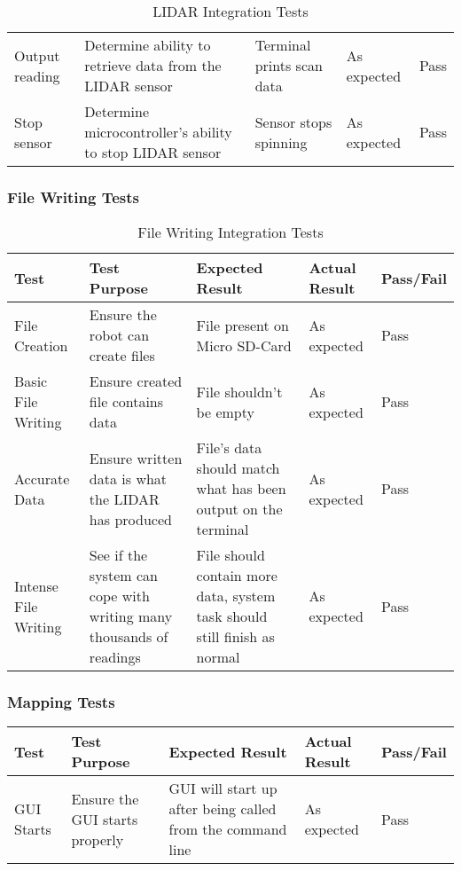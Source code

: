 \begin{landscape}
\begin{table}[h!]
\begin{tabular}{| p{2.5cm} | p{5cm} | p{4cm} | p{3cm} | p{1.5cm} |}
							Output reading & Determine ability to retrieve data from the LIDAR sensor & Terminal prints scan data & As expected & Pass \\
							 
							Stop sensor & Determine microcontroller's ability to stop LIDAR sensor & Sensor stops spinning & As expected & Pass   \\ [1ex] 
							\hline
						\end{tabular}	
					\caption{LIDAR Integration Tests}	
					\label{table:lidartestbasic}
					\end{table}
				
					\subsubsection{File Writing Tests}
					\begin{table}[h!]
						\centering
						\begin{tabular}{| p{2.5cm} | p{5cm} | p{4cm} | p{3cm} | p{1.5cm} |} 
							\hline
							Test & Test Purpose & Expected Result & Actual Result & Pass/Fail \\ [0.5ex] 
							\hline
							File Creation & Ensure the robot can create files & File present on Micro SD-Card & As expected & Pass  \\
							
							Basic File Writing & Ensure created file contains data & File shouldn't be empty & As expected & Pass \\
							
							Accurate Data & Ensure written data is what the LIDAR has produced & File's data should match what has been output on the terminal & As expected & Pass \\ 
							
							Intense File Writing & See if the system can cope with writing many thousands of readings & File should contain more data, system task should still finish as normal & As expected & Pass \\
							[1ex] 
							\hline
						\end{tabular}
					\caption{File Writing Integration Tests}
					\label{table:filewritingtests}		
					\end{table}
				
					\subsubsection{Mapping Tests}
					\begin{table}[h!]
						\centering
						\begin{tabular}{| p{2.5cm} | p{5cm} | p{4cm} | p{3cm} | p{1.5cm} |} 
							\hline
							Test & Test Purpose & Expected Result & Actual Result & Pass/Fail \\ [0.5ex] 
							\hline
							GUI Starts & Ensure the GUI starts properly & GUI will start up after being called from the command line & As expected & Pass  \\
							

\end{tabular}
\end{table}
\end{landscape}
